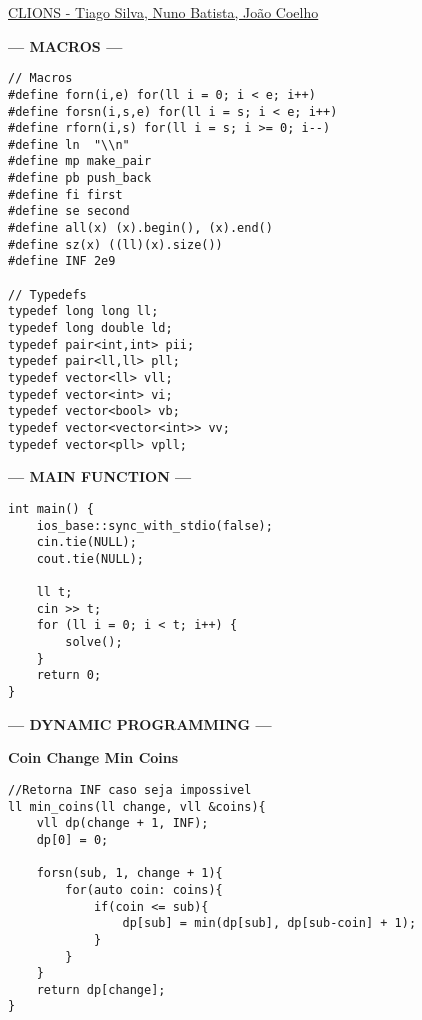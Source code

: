 \documentclass{article}
\begin{document}
\raggedright
\footnotesize

\begin{center}
     \large{\underline{CLIONS - Tiago Silva, Nuno Batista, João Coelho}} \\
\end{center}

\begin{multicols}{2}

\large
\begin{center}
\huge\textbf{--- MACROS ---}
\end{center}
\large
\begin{lstlisting}
// Macros
#define forn(i,e) for(ll i = 0; i < e; i++)
#define forsn(i,s,e) for(ll i = s; i < e; i++)
#define rforn(i,s) for(ll i = s; i >= 0; i--)
#define ln  "\\n"
#define mp make_pair
#define pb push_back
#define fi first
#define se second
#define all(x) (x).begin(), (x).end()
#define sz(x) ((ll)(x).size())
#define INF 2e9

// Typedefs
typedef long long ll;
typedef long double ld;
typedef pair<int,int> pii;
typedef pair<ll,ll> pll;
typedef vector<ll> vll;
typedef vector<int> vi;
typedef vector<bool> vb;
typedef vector<vector<int>> vv;
typedef vector<pll> vpll;
\end{lstlisting}

\large
\begin{center}
\huge\textbf{--- MAIN FUNCTION ---}
\end{center}
\large
\begin{lstlisting}
int main() {
    ios_base::sync_with_stdio(false);
    cin.tie(NULL); 
    cout.tie(NULL);

    ll t;
    cin >> t;
    for (ll i = 0; i < t; i++) {
        solve();
    }
    return 0;
}
\end{lstlisting}

\large
\begin{center}
\huge\textbf{--- DYNAMIC PROGRAMMING ---}
\end{center}
\large

\large
\huge\textbf{Coin Change Min Coins}
\large
\begin{lstlisting}
//Retorna INF caso seja impossivel
ll min_coins(ll change, vll &coins){
	vll dp(change + 1, INF); 
	dp[0] = 0; 

	forsn(sub, 1, change + 1){
		for(auto coin: coins){
			if(coin <= sub){
				dp[sub] = min(dp[sub], dp[sub-coin] + 1);
			}
		}
	}
	return dp[change];
}


\end{lstlisting}
\end{multicols}
\end{document}
